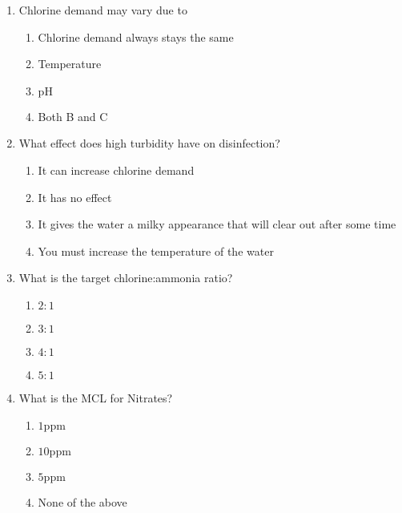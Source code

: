 \begin{enumerate}
\item  Chlorine demand may vary due to\\
\begin{enumerate}
\item Chlorine demand always stays the same\\
\item Temperature\\
\item $\mathrm{pH}$\\
\item Both B and C
\end{enumerate}

\item  What effect does high turbidity have on disinfection?\\
\begin{enumerate}
\item It can increase chlorine demand\\
\item It has no effect\\
\item It gives the water a milky appearance that will clear out after some time\\
\item You must increase the temperature of the water
\end{enumerate}

  \item What is the target chlorine:ammonia ratio?\\
\begin{enumerate}
\item $2: 1$\\
\item $3: 1$\\
\item $4: 1$\\
\item $5: 1$
\end{enumerate}

\item  What is the MCL for Nitrates?\\
\begin{enumerate}
\item $1 \mathrm{ppm}$\\
\item $10 \mathrm{ppm}$\\
\item $5 \mathrm{ppm}$\\
\item None of the above
\end{enumerate}


\end{enumerate}
